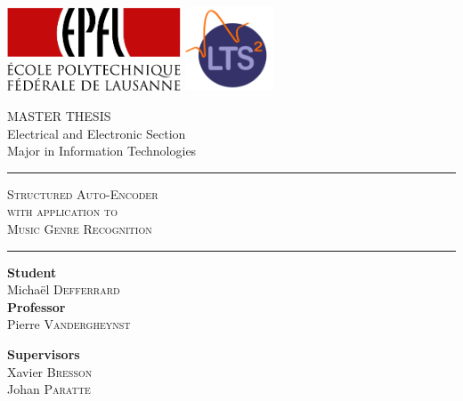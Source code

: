 \documentclass[a4paper,12pt,twoside]{report}
\newcommand{\HRule}{\rule{\linewidth}{0.5mm}}
\begin{document}
\begin{titlepage}
	
	\includegraphics[height=2.5cm]{img/logo_epfl}
	\hfill
	\includegraphics[height=2.5cm]{img/logo_lts2}
	\vspace{1.2cm}
	
	\begin{center}
		
		\textsc{\LARGE MASTER THESIS}\\
		\vspace{0.5cm}
		\large Electrical and Electronic Section\\
		\large Major in Information Technologies\\
		\vspace{0.8cm}
		
		\HRule
		\vspace{0.9cm}
		\textsc{\Huge Structured Auto-Encoder}\\
		\vspace{0.5cm}
		\textsc{\Large with application to}\\
		\vspace{0.2cm}
		\textsc{\Large Music Genre Recognition}\\
		\vspace{0.6cm}
		\HRule
		\vspace{1.3cm}
		
		\begin{minipage}{0.45\textwidth}
			\begin{flushleft} \large
				\textbf{Student}\\ \vspace{0.5ex}
				Michaël \textsc{Defferrard} \\ \vspace{2.5ex}
				\textbf{Professor} \\ \vspace{0.5ex}
				Pierre \textsc{Vandergheynst}
			\end{flushleft}
		\end{minipage}
		\begin{minipage}{0.45\textwidth}
			\begin{flushright} \large
				\textbf{Supervisors} \\ \vspace{0.5ex}
				Xavier \textsc{Bresson} \\ \vspace{0.2ex}
				Johan \textsc{Paratte}
			\end{flushright}
		\end{minipage}
		

\end{center}
\end{titlepage}
\end{document}
